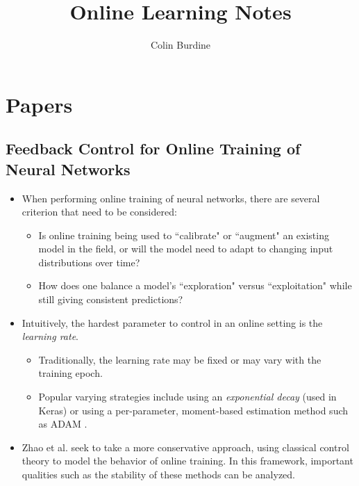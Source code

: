\documentclass[12pt]{article}
\author{Colin Burdine}
\title{Online Learning Notes}
\date{}
\begin{document}
\maketitle

\section{Papers}

\subsection{Feedback Control for Online Training of Neural Networks \cite{zhao_feedback}}

\begin{itemize}
\item When performing online training of neural networks, there are several criterion that need to be considered:

\begin{itemize}
\item Is online training being used to ``calibrate" or ``augment" an existing model in the field, or will the model need to adapt to changing input distributions over time?

\item How does one balance a model's ``exploration" versus ``exploitation" while still giving consistent predictions?

\end{itemize}

\item Intuitively, the hardest parameter to control in an online setting is the \textit{learning rate}. 

\begin{itemize}
\item Traditionally, the learning rate may be fixed or may vary with the training epoch.

\item Popular varying strategies include using an \textit{exponential decay} (used in Keras) or using a per-parameter, moment-based estimation method such as ADAM \cite{kingma_adam}.
\end{itemize}

\item Zhao et al. seek to take a more conservative approach, using classical control theory to model the behavior of online training. In this framework, important qualities such as the stability of these methods can be analyzed.


\end{itemize}
\end{document}
